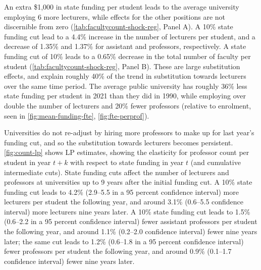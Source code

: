 An extra \$1,000 in state funding per student leads to the average university employing 6 more lecturers, while effects for the other positions are not discernible from zero (\autoref{tab:facultycount-shock-reg}, Panel A).
A 10\% state funding cut lead to a 4.4\% increase in the number of lecturers per student, and a decrease of 1.35\% and 1.37\% for assistant and professors, respectively.
A state funding cut of 10\% leads to a 0.65\% decrease in the total number of faculty per student (\autoref{tab:facultycount-shock-reg}, Panel B).
These are large substitution effects, and explain roughly 40\% of the trend in substitution towards lecturers over the same time period.
The average public university has roughly 36\% less state funding per student in 2021 than they did in 1990, while employing over double the number of lecturers and 20\% fewer professors (relative to enrolment, seen in \autoref{fig:mean-funding-fte}, \ref{fig:fte-perprof}).

Universities do not re-adjust by hiring more professors to make up for last year's funding cut, and so the substitution towards lecturers becomes persistent.
\autoref{fig:count-lp} shows LP estimates, showing the elasticity for professor count per student in year $t+k$ with respect to state funding in year $t$ (and cumulative intermediate cuts).
State funding cuts affect the number of lecturers and professors at universities up to 9 years after the initial funding cut.
A 10\% state funding cut leads to 4.2\% (2.9--5.5 in a 95 percent confidence interval) more lecturers per student the following year, and around 3.1\% (0.6--5.5 confidence interval) more lecturers nine years later.
A 10\% state funding cut leads to 1.5\% (0.6--2.2 in a 95 percent confidence interval) fewer assistant professors per student the following year, and around 1.1\% (0.2--2.0 confidence interval) fewer nine years later;
the same cut leads to 1.2\% (0.6--1.8 in a 95 percent confidence interval) fewer professors per student the following year, and around 0.9\% (0.1--1.7 confidence interval) fewer nine years later.

